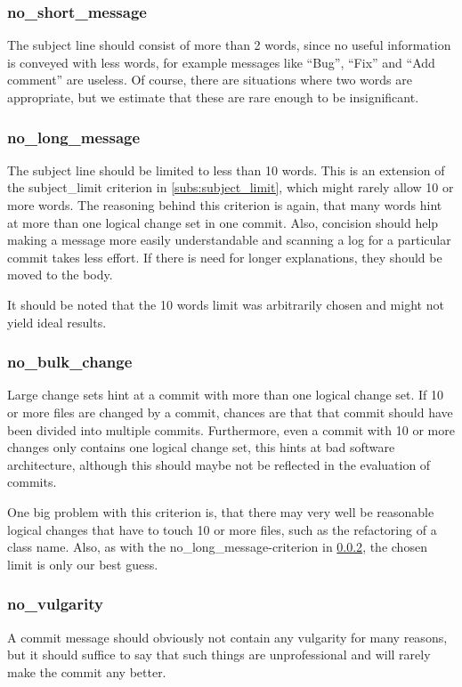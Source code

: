 \subsubsection{no\_short\_message}
\label{subs:no_short_message}
The subject line should consist of more than 2 words, since no useful information is conveyed with less words, for example messages like ``Bug'', ``Fix'' and ``Add comment'' are useless. Of course, there are situations where two words are appropriate, but we estimate that these are rare enough to be insignificant.

\subsubsection{no\_long\_message}
\label{subs:no_long_message}
The subject line should be limited to less than 10 words. This is an extension of the subject\_limit criterion in \ref{subs:subject_limit}, which might rarely allow 10 or more words. The reasoning behind this criterion is again, that many words hint at more than one logical change set in one commit. Also, concision should help making a message more easily understandable and scanning a log for a particular commit takes less effort. If there is need for longer explanations, they should be moved to the body.

It should be noted that the 10 words limit was arbitrarily chosen and might not yield ideal results.

\subsubsection{no\_bulk\_change}
\label{subs:no_bulk_change}
Large change sets hint at a commit with more than one logical change set. If 10 or more files are changed by a commit, chances are that that commit should have been divided into multiple commits. Furthermore, even a commit with 10 or more changes only contains one logical change set, this hints at bad software architecture, although this should maybe not be reflected in the evaluation of commits.

One big problem with this criterion is, that there may very well be reasonable logical changes that have to touch 10 or more files, such as the refactoring of a class name. Also, as with the no\_long\_message-criterion in \ref{subs:no_long_message}, the chosen limit is only our best guess.

\subsubsection{no\_vulgarity}
\label{subs:no_vulgarity}
A commit message should obviously not contain any vulgarity for many reasons, but it should suffice to say that such things are unprofessional and will rarely make the commit any better.

